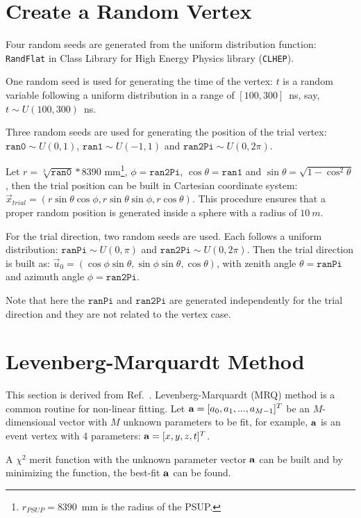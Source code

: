 \section{Create a Random Vertex}\label{appendix:random_gen}

Four random seeds are generated from the uniform distribution function: \texttt{RandFlat} in Class Library for High Energy Physics library (\texttt{CLHEP}).

One random seed is used for generating the time of the vertex: $t$ is a random variable following a uniform distribution in a range of $[100, 300]$~ns, say, $t\sim U(100,300)$~ns.

Three random seeds are used for generating the position of the trial vertex: $\texttt{ran0}\sim U(0,1)$, $\texttt{ran1}\sim U(-1,1)$ and $\texttt{ran2Pi}\sim U(0,2\pi)$.

Let $r=\sqrt[3]{\texttt{ran0}}*8390$ mm\footnote{$r_{PSUP}=8390$~mm is the radius of the PSUP.}, $\phi=\texttt{ran2Pi}$, $\cos\theta=\texttt{ran1}$ and $\sin\theta=\sqrt{1-{\cos^2\theta}}$, then the trial position can be built in Cartesian coordinate system: $\vec{x}_{trial}=(r\sin\theta\cos\phi, r\sin\theta\sin\phi, r\cos\theta)$. This procedure ensures that a proper random position is generated inside a sphere with a radius of $10~m$.

For the trial direction, two random seeds are used. Each follows a uniform distribution: $\texttt{ranPi}\sim U(0,\pi)$ and $\texttt{ran2Pi}\sim U(0,2\pi)$. Then the trial direction is built as: $\vec{u}_{0}=(\cos\phi\sin\theta,\sin\phi\sin\theta,\cos\theta)$, with zenith angle $\theta=\texttt{ranPi}$ and azimuth angle $\phi=\texttt{ran2Pi}$.

Note that here the $\texttt{ranPi}$ and $\texttt{ran2Pi}$ are generated independently for the trial direction and they are not related to the vertex case.

\section[Levenberg-Marquardt Method]{Levenberg-Marquardt Method}\label{appendix:MRQ}
This section is derived from Ref.~\cite{press2007numerical}. Levenberg-Marquardt (MRQ) method is a common routine for non-linear fitting. Let ${\bf a} = [a_0, a_1, ..., a_{M-1}]^T$ be an $M$-dimensional vector with $M$ unknown parameters to be fit, for example, $\bf a$ is an event vertex with 4 parameters: ${\bf a}=[x,y,z,t]^T$.

A $\chi^2$ merit function with the unknown parameter vector $\bf a$ can be built and by minimizing the function, the best-fit $\bf a$ can be found.

